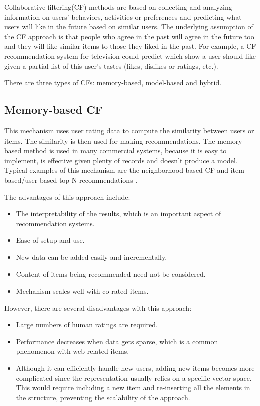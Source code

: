 Collaborative filtering(CF) methods are based on collecting and analyzing information on users’ behaviors, activities or preferences and predicting what users will like in the future based on similar users. The underlying assumption of the CF approach is that people who agree in the past will agree in the future too and they will like similar items to those they liked in the past. For example, a CF recommendation system for television could predict which show a user should like given a partial list of this user’s tastes (likes, dislikes or ratings, etc.).

There are three types of CFs: memory-based, model-based and hybrid.

\hspace{0.05in}
\subsection{Memory-based CF}
This mechanism uses user rating data to compute the similarity between users or items. The similarity is then used for making recommendations. The memory-based method is used in many commercial systems, because it is easy to implement, is effective given plenty of records and doesn’t produce a model. Typical examples of this mechanism are the neighborhood based CF and item-based/user-based top-N recommendations \cite{su2009survey}.

The advantages of this approach include:
\begin{itemize}
\item The interpretability of the results, which is an important aspect of recommendation systems.
\item Ease of setup and use.
\item New data can be added easily and incrementally.
\item Content of items being recommended need not be considered.
\item Mechanism scales well with co-rated items.
\end{itemize}

However, there are several disadvantages with this approach:
\begin{itemize}
\item Large numbers of human ratings are required.
\item Performance decreases when data gets sparse, which is a common phenomenon with web related items.
\item Although it can efficiently handle new users, adding new items becomes more complicated since the representation usually relies on a specific vector space. This would require including a new item and re-inserting all the elements in the structure, preventing the scalability of the approach.
\end{itemize}

